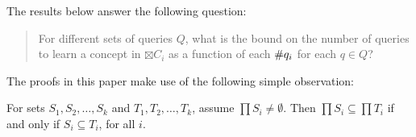 The results below answer the following question:
\begin{quote}
For different sets of queries $Q$, what is the bound on the number of queries to learn a concept in $\boxtimes C_i $ as a function of each $\#q_{i}$ for each $q \in Q$?
\end{quote}

The proofs in this paper make use of the following simple observation:
\begin{observation}
\label{subobs}
For sets $S_1, S_2, \dots, S_k$ and $T_1, T_2, \dots, T_k$, assume $\prod S_i \ne \emptyset$.  Then $\prod S_i \subseteq \prod T_i$ if and only if $S_i \subseteq T_i$, for all $i$.
\end{observation}

